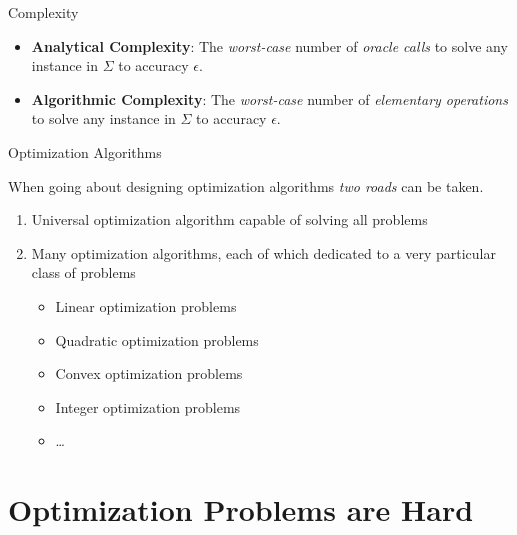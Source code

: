 \documentclass[9pt]{beamer}
\begin{document}
\begin{frame}{Complexity}

  \begin{itemize}
    \setlength\itemsep{2em}
  \item \textbf{Analytical Complexity}: The \emph{worst-case} number of \emph{oracle calls} to solve any instance in $\Sigma$ to accuracy $\epsilon$.
  \item<2-> \textbf{Algorithmic Complexity}: The \emph{worst-case} number of \emph{elementary operations} to solve any instance in $\Sigma$ to accuracy $\epsilon$.
  \end{itemize}
  
\end{frame}

\begin{frame}{Optimization Algorithms}

  When going about designing optimization algorithms \emph{two roads} can be taken.

  \vfill
  
  \begin{enumerate}
    \setlength\itemsep{2em}
  \item Universal optimization algorithm capable of solving all problems \\[1em]

  \item<2-> Many optimization algorithms, each of which dedicated to a very particular class of problems
    \begin{itemize}
      \setlength\itemsep{1em}
    \item Linear optimization problems
    \item Quadratic optimization problems
    \item Convex optimization problems
    \item Integer optimization problems
    \item \dots
    \end{itemize}
  \end{enumerate}

  \vspace{1em}

\end{frame}

\section{Optimization Problems are Hard}
\end{document}
